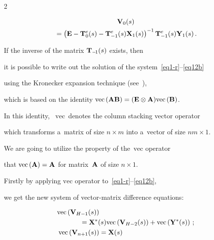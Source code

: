 \begin{multicols}{2}
\noindent


\begin{multline*}


\bmx{V}_{0}(s)\\


{}=\left(\bmx{E}-\bmx{T}^e_0(s)-\bmx{T}^e_{-1}(s)\bmx{X}_{1}(s)


\right)^{-1}\bmx{T}^e_{-1}(s)\bmx{Y}_{1}(s)\,. 


\end{multline*}





If the inverse of the matrix $\mathbf{T}_{-\!1}(s)$ exists, then 


it is possible to write out the solution of the system~\eqref{eq1-r}--\eqref{eq12b}


using the Kronecker expansion technique (see~\cite{Steeb,Graham,Telek}),


which is based on the identity $\mathrm{vec}\,(\bmx{A}\bmx{B})=


(\bmx{E} \otimes \bmx{A}) \mathrm{vec}\,(\bmx{B})$.


In this identity, ~$\mathrm{vec}$\ denotes the column stacking vector operator


which transforms a~matrix of size $n \times m$ into a~vector of size $nm \times 1$.


We are going to utilize the property of the~$\mathrm{vec}$ operator 


that $\mathrm{vec}\,(\mathbf{A})=\mathbf{A}$ for matrix~$\mathbf{A}$ of size $n \times 1$.


Firstly by applying $\mathrm{vec}$ operator to~\eqref{eq1-r}--\eqref{eq12b},


we get the new system of vector-matrix difference equations:


\begin{align}


\label{H-1}


\mathrm{vec}\left(\bmx{V}_{H-1}(s)\right)


&\notag\\


&\hspace*{-10mm}{}= \bmx{X}^*(s) \mathrm{vec}\left(\bmx{V}_{H-2}(s)\right) +


\mathrm{vec}\left(\bmx{Y}^*(s)\right)\,;


\\


\label{n}


\mathrm{vec}\left(\bmx{V}_{n+1}(s)\right)&=\bmx{X}(s)



\end{align}
\end{multicols}
